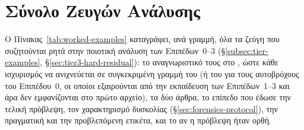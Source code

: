 \section{Σύνολο Ζευγών Ανάλυσης}
\label{sec:worked-examples}

Ο Πίνακας~\ref{tab:worked-examples} καταγράφει, ανά γραμμή, όλα τα ζεύγη που
συζητούνται ρητά στην ποιοτική ανάλυση των Επιπέδων~0--3 (\S\ref{subsec:tier-examples},
\S\ref{sec:tier3-hard-residual}): το αναγνωριστικό \texttt{} τους στο
\texttt{}, ώστε κάθε ισχυρισμός να ανιχνεύεται σε συγκεκριμένη γραμμή
του \texttt{} (ή του \texttt{} για τους
αυτοβρόχους του Επιπέδου~0, οι οποίοι εξαιρούνται από την εκπαίδευση των
Επιπέδων~1--3 και άρα δεν εμφανίζονται στο πρώτο αρχείο), τα δύο άρθρα, το
επίπεδο που έδωσε την τελική πρόβλεψη, τον χαρακτηρισμό δυσκολίας
(\S\ref{sec:forensics-protocol}), την πραγματική και την προβλεπόμενη ετικέτα, και
το αν η πρόβλεψη ήταν ορθή.

